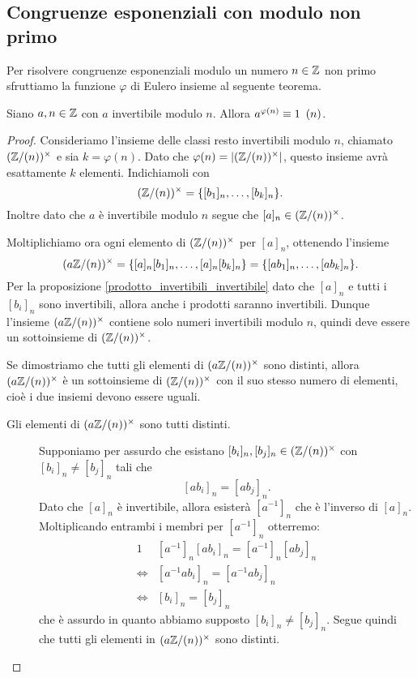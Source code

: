 \subsection{Congruenze esponenziali con modulo non primo}

Per risolvere congruenze esponenziali modulo un numero $n \in \mathbb{Z}$ non primo sfruttiamo la funzione $\varphi$ di Eulero insieme al seguente teorema.

\begin{theorem}
     \label{th_Eulero}
    Siano $a, n \in \mathbb{Z}$ con $a$ invertibile modulo $n$. Allora $a^{\varphi(n)} \equiv 1 \ \left(n\right)$.
\end{theorem}
\begin{proof}
    Consideriamo l'insieme delle classi resto invertibili modulo $n$, chiamato $(\mathbb{Z}/(n))^{\times}$ e sia $k = \varphi(n)$. Dato che $\varphi(n) = \left|(\mathbb{Z}/(n))^{\times}\right|$, questo insieme avrà esattamente $k$ elementi. Indichiamoli con \[
        (\mathbb{Z}/(n))^{\times} = \{[b_1]_n, \dots, [b_k]_n\}.   
    \]
    Inoltre dato che $a$ è invertibile modulo $n$ segue che $[a]_n \in (\mathbb{Z}/(n))^{\times}$. 

    Moltiplichiamo ora ogni elemento di $(\mathbb{Z}/(n))^{\times}$ per $[a]_n$, ottenendo l'insieme \[
        (a\mathbb{Z}/(n))^{\times} = \{[a]_n[b_1]_n, \dots, [a]_n[b_k]_n\} = \{[ab_1]_n, \dots, [ab_k]_n\}.
    \]
    Per la proposizione \ref{prodotto_invertibili_invertibile} dato che $[a]_n$ e tutti i $[b_i]_n$ sono invertibili, allora anche i prodotti saranno invertibili. Dunque l'insieme $(a\mathbb{Z}/(n))^{\times}$ contiene solo numeri invertibili modulo $n$, quindi deve essere un sottoinsieme di $(\mathbb{Z}/(n))^{\times}$.

    Se dimostriamo che tutti gli elementi di $(a\mathbb{Z}/(n))^{\times}$ sono distinti, allora $(a\mathbb{Z}/(n))^{\times}$ è un sottoinsieme di $(\mathbb{Z}/(n))^{\times}$ con il suo stesso numero di elementi, cioè i due insiemi devono essere uguali.

    \begin{description}
        \item[Gli elementi di $(a\mathbb{Z}/(n))^{\times}$ sono tutti distinti.] Supponiamo per assurdo che esistano $[b_i]_n, [b_j]_n \in (\mathbb{Z}/(n))^{\times}$ con $[b_i]_n \neq [b_j]_n$ tali che \[
            [ab_i]_n = [ab_j]_n.
        \]
        Dato che $[a]_n$ è invertibile, allora esisterà $[a^{-1}]_n$ che è l'inverso di $[a]_n$. Moltiplicando entrambi i membri per $[a^{-1}]_n$ otterremo: \begin{alignat*}
            {1}
            &[a^{-1}]_n[ab_i]_n = [a^{-1}]_n[ab_j]_n \\
            \iff &[a^{-1}ab_i]_n = [a^{-1}ab_j]_n \\
            \iff &[b_i]_n = [b_j]_n 
        \end{alignat*}
        che è assurdo in quanto abbiamo supposto $[b_i]_n \neq [b_j]_n$. Segue quindi che tutti gli elementi in $(a\mathbb{Z}/(n))^{\times}$ sono distinti.
    \end{description}


\end{proof}

